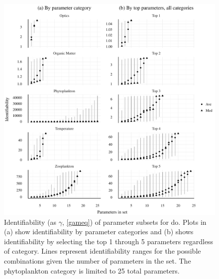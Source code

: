 \documentclass[letterpaper,12pt,oneside]{article}\usepackage[]{graphicx}\usepackage[]{color}
\makeatletter
\def\maxwidth{ %
  \ifdim\Gin@nat@width>\linewidth
    \linewidth
  \else
    \Gin@nat@width
  \fi
}
\makeatother
\begin{document}
\begin{figure}[!ht]

{\centering \includegraphics[width=\maxwidth]{figs/identbox-1} 

}

\caption[Identifiability (as ]{Identifiability (as $\gamma$, \cref{gameq}) of parameter subsets for \ac{do}.  Plots in (a) show identifiability by parameter categories and (b) shows identifiability by selecting the top 1 through 5 parameters regardless of category.  Lines represent identifiability ranges for the possible combinations given the number of parameters in the set.  The phytoplankton category is limited to 25 total parameters.}\label{fig:identbox}
\end{figure}
\end{document}
